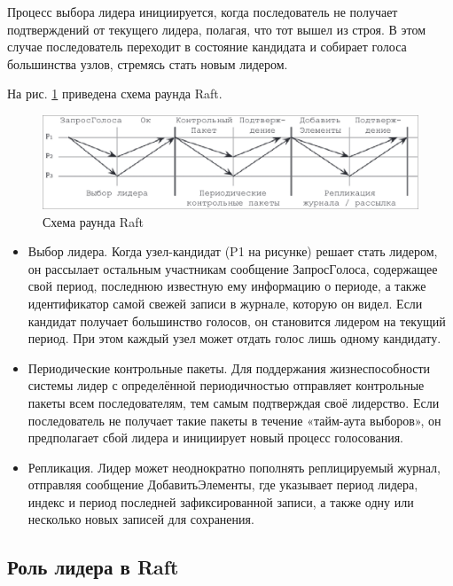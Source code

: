 Процесс выбора лидера инициируется, когда последователь не получает подтверждений
от текущего лидера, полагая, что тот вышел из строя. В этом случае последователь
переходит в состояние кандидата и собирает голоса большинства узлов, стремясь
стать новым лидером.

На рис. \ref{fig:raft} приведена схема раунда Raft.

\begin{figure}
  \centering
  \includegraphics[scale=0.4]{inc/raft.png}
  \caption{Схема раунда Raft}
  \label{fig:raft}
\end{figure}

\begin{itemize}
    \item Выбор лидера. Когда узел-кандидат (P1 на рисунке) решает стать лидером,
        он рассылает остальным участникам сообщение $ЗапросГолоса$, содержащее свой
        период, последнюю известную ему информацию о периоде, а также идентификатор
        самой свежей записи в журнале, которую он видел. Если кандидат получает
        большинство голосов, он становится лидером на текущий период. При этом
        каждый узел может отдать голос лишь одному кандидату.
    \item Периодические контрольные пакеты. Для поддержания жизнеспособности
        системы лидер с определённой периодичностью отправляет контрольные
        пакеты всем последователям, тем самым подтверждая своё лидерство. Если
        последователь не получает такие пакеты в течение «тайм-аута выборов»,
        он предполагает сбой лидера и инициирует новый процесс голосования.
    \item Репликация. Лидер может неоднократно пополнять реплицируемый журнал,
        отправляя сообщение $ДобавитьЭлементы$, где указывает период лидера,
        индекс и период последней зафиксированной записи, а также одну или
        несколько новых записей для сохранения.
\end{itemize}

\subsection{Роль лидера в Raft}

